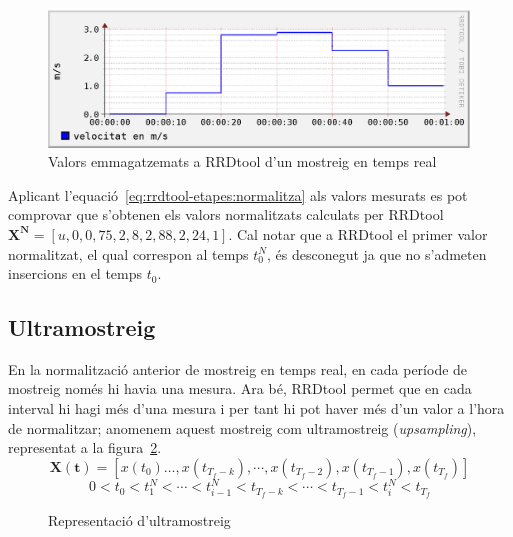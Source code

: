 \begin{figure}[htp]
  \centering
  \includegraphics[width=\textwidth]{imatges/rrdtool/velocitat_irregular.eps}
  \caption{Valors emmagatzemats a RRDtool d'un mostreig en temps real}
  \label{fig:rrdtool:velocitat_irregular}
\end{figure}

Aplicant l'equació~\ref{eq:rrdtool-etapes:normalitza} als valors mesurats es pot comprovar que s'obtenen els valors normalitzats calculats per RRDtool 
$\mathbf{X^N}=[u , 0 , 0{,}75 , 2{,}8 , 2{,}88 , 2{,}24 , 1]$. 
Cal notar que a RRDtool el primer valor normalitzat, el qual correspon al temps $t^N_0$, és desconegut ja que no s'admeten insercions en el temps $t_0$.


\subsection{Ultramostreig}

En la normalització anterior de mostreig en temps real, en cada període de mostreig només hi havia una mesura. Ara bé, RRDtool permet que en cada interval hi hagi més d'una mesura i per tant hi pot haver més d'un valor a l'hora de normalitzar; anomenem aquest mostreig com ultramostreig (\emph{upsampling}), representat a la figura~\ref{fig:rrdtool-etapes:ultramostreig}.
$$
\mathbf{X(t)}= [x(t_0)\ldots,x(t_{T_f-k}),\cdots,x(t_{T_f-2}),x(t_{T_f-1}),x(t_{T_f})]
$$
$$
0< t_0 < t^N_1 < \cdots <   t^N_{i-1}<t_{T_f-k} <\cdots< t_{T_f-1} < t^N_i < t_{T_f}
$$

\begin{figure}[tbp]
  \centering
  \caption{Representació d'ultramostreig}
  \label{fig:rrdtool-etapes:ultramostreig}
\end{figure}

